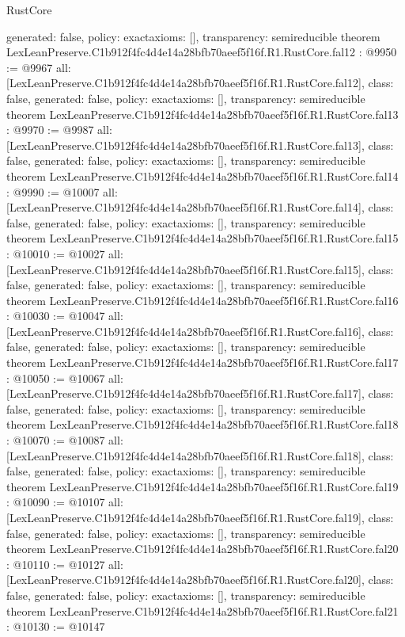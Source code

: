\begin{lexlean}{RustCore}
\begin{coremodule}
{  generated: false,
  policy: exact{axioms: []},
  transparency: semireducible
}
theorem LexLeanPreserve.C1b912f4fc4d4e14a28bfb70aeef5f16f.R1.RustCore.fal12 : @9950 := @9967 {
  all: [LexLeanPreserve.C1b912f4fc4d4e14a28bfb70aeef5f16f.R1.RustCore.fal12],
  class: false,
  generated: false,
  policy: exact{axioms: []},
  transparency: semireducible
}
theorem LexLeanPreserve.C1b912f4fc4d4e14a28bfb70aeef5f16f.R1.RustCore.fal13 : @9970 := @9987 {
  all: [LexLeanPreserve.C1b912f4fc4d4e14a28bfb70aeef5f16f.R1.RustCore.fal13],
  class: false,
  generated: false,
  policy: exact{axioms: []},
  transparency: semireducible
}
theorem LexLeanPreserve.C1b912f4fc4d4e14a28bfb70aeef5f16f.R1.RustCore.fal14 : @9990 := @10007 {
  all: [LexLeanPreserve.C1b912f4fc4d4e14a28bfb70aeef5f16f.R1.RustCore.fal14],
  class: false,
  generated: false,
  policy: exact{axioms: []},
  transparency: semireducible
}
theorem LexLeanPreserve.C1b912f4fc4d4e14a28bfb70aeef5f16f.R1.RustCore.fal15 : @10010 := @10027 {
  all: [LexLeanPreserve.C1b912f4fc4d4e14a28bfb70aeef5f16f.R1.RustCore.fal15],
  class: false,
  generated: false,
  policy: exact{axioms: []},
  transparency: semireducible
}
theorem LexLeanPreserve.C1b912f4fc4d4e14a28bfb70aeef5f16f.R1.RustCore.fal16 : @10030 := @10047 {
  all: [LexLeanPreserve.C1b912f4fc4d4e14a28bfb70aeef5f16f.R1.RustCore.fal16],
  class: false,
  generated: false,
  policy: exact{axioms: []},
  transparency: semireducible
}
theorem LexLeanPreserve.C1b912f4fc4d4e14a28bfb70aeef5f16f.R1.RustCore.fal17 : @10050 := @10067 {
  all: [LexLeanPreserve.C1b912f4fc4d4e14a28bfb70aeef5f16f.R1.RustCore.fal17],
  class: false,
  generated: false,
  policy: exact{axioms: []},
  transparency: semireducible
}
theorem LexLeanPreserve.C1b912f4fc4d4e14a28bfb70aeef5f16f.R1.RustCore.fal18 : @10070 := @10087 {
  all: [LexLeanPreserve.C1b912f4fc4d4e14a28bfb70aeef5f16f.R1.RustCore.fal18],
  class: false,
  generated: false,
  policy: exact{axioms: []},
  transparency: semireducible
}
theorem LexLeanPreserve.C1b912f4fc4d4e14a28bfb70aeef5f16f.R1.RustCore.fal19 : @10090 := @10107 {
  all: [LexLeanPreserve.C1b912f4fc4d4e14a28bfb70aeef5f16f.R1.RustCore.fal19],
  class: false,
  generated: false,
  policy: exact{axioms: []},
  transparency: semireducible
}
theorem LexLeanPreserve.C1b912f4fc4d4e14a28bfb70aeef5f16f.R1.RustCore.fal20 : @10110 := @10127 {
  all: [LexLeanPreserve.C1b912f4fc4d4e14a28bfb70aeef5f16f.R1.RustCore.fal20],
  class: false,
  generated: false,
  policy: exact{axioms: []},
  transparency: semireducible
}
theorem LexLeanPreserve.C1b912f4fc4d4e14a28bfb70aeef5f16f.R1.RustCore.fal21 : @10130 := @10147 {
}
\end{coremodule}
\end{lexlean}
